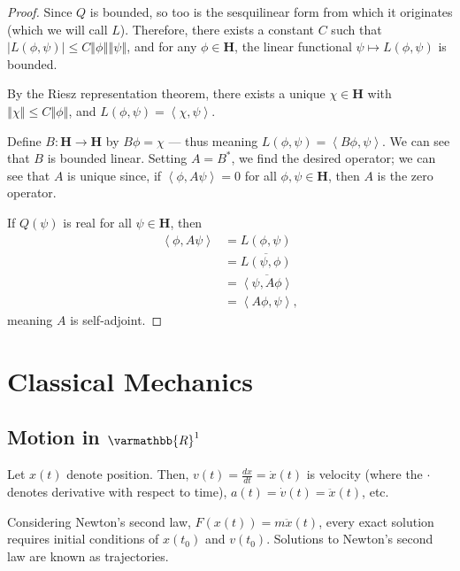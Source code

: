 \documentclass[12pt]{extarticle}
\newcommand{\R}{\varmathbb{R}}
\newcommand{\iprod}[2]{\left\langle #1,#2\right\rangle}
\newcommand{\norm}[1]{\left\Vert #1\right\Vert}
\theoremstyle{plain}
\theoremstyle{definition}
\theoremstyle{remark}
\renewcommand{\newline}{\hfill\break}
\begin{document}
  \begin{proof}
    Since $Q$ is bounded, so too is the sesquilinear form from which it originates (which we will call $L$). Therefore, there exists a constant $C$ such that $\left\vert L(\phi,\psi) \right\vert\leq C\norm{\phi}\norm{\psi}$, and for any $\phi \in \mathbf{H}$, the linear functional $\psi \mapsto L(\phi,\psi)$ is bounded.\newline

    By the Riesz representation theorem, there exists a unique $\chi \in \mathbf{H}$ with $\norm{\chi} \leq C\norm{\phi}$, and $L(\phi,\psi) = \iprod{\chi}{\psi}$.\newline

    Define $B: \mathbf{H}\rightarrow \mathbf{H}$ by $B\phi = \chi$ --- thus meaning $L(\phi,\psi) = \iprod{B\phi}{\psi}$. We can see that $B$ is bounded linear. Setting $A = B^{\ast}$, we find the desired operator; we can see that $A$ is unique since, if $\iprod{\phi}{A\psi} = 0$ for all $\phi,\psi \in \mathbf{H}$, then $A$ is the zero operator.\newline

    If $Q(\psi)$ is real for all $\psi \in \mathbf{H}$, then
    \begin{align*}
      \iprod{\phi}{A\psi} &= L(\phi,\psi)\\
                          &= \overline{L(\psi,\phi)}\\
                          &= \overline{\iprod{\psi}{A\phi}}\\
                          &= \iprod{A\phi}{\psi},
    \end{align*}
    meaning $A$ is self-adjoint.
  \end{proof}
  \section{Classical Mechanics}%
  \subsection{Motion in $\R^{1}$}%
  Let $x(t)$ denote position. Then, $v(t) = \frac{dx}{dt} = \dot{x}(t)$ is velocity (where the $\cdot$ denotes derivative with respect to time), $a(t) = \dot{v}(t) = \ddot{x}(t)$, etc.\newline

  Considering Newton's second law, $F(x(t)) = m\ddot{x}(t)$, every exact solution requires initial conditions of $x(t_0)$ and $v(t_0)$. Solutions to Newton's second law are known as trajectories.\newline
\end{document}
